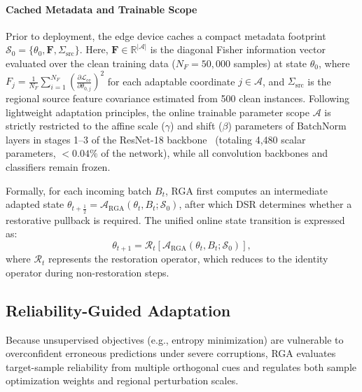 \documentclass[journal]{IEEEtran}
\begin{document}
\paragraph*{Cached Metadata and Trainable Scope}
Prior to deployment, the edge device caches a compact metadata footprint $\mathcal{S}_0 = \{\theta_0, \mathbf{F}, \Sigma_{\mathrm{src}}\}$. Here, $\mathbf{F} \in \mathbb{R}^{|\mathcal{A}|}$ is the diagonal Fisher information vector evaluated over the clean training data ($N_F = 50,000$ samples) at state $\theta_0$, where $F_j = \frac{1}{N_F} \sum_{i=1}^{N_F} (\frac{\partial \mathcal{L}_{\mathrm{ce}}}{\partial \theta_{0,j}})^2$ for each adaptable coordinate $j \in \mathcal{A}$, and $\Sigma_{\mathrm{src}}$ is the regional source feature covariance estimated from 500 clean instances. Following lightweight adaptation principles, the online trainable parameter scope $\mathcal{A}$ is strictly restricted to the affine scale ($\gamma$) and shift ($\beta$) parameters of BatchNorm layers in stages 1--3 of the ResNet-18 backbone~\cite{3} (totaling 4,480 scalar parameters, $<0.04\%$ of the network), while all convolution backbones and classifiers remain frozen.

Formally, for each incoming batch $B_t$, RGA first computes an intermediate adapted state $\theta_{t+\frac{1}{2}} = \mathcal{A}_{\mathrm{RGA}}(\theta_t, B_t; \mathcal{S}_0)$, after which DSR determines whether a restorative pullback is required. The unified online state transition is expressed as:
\begin{equation}
\label{eq:overall_transition}
\theta_{t+1} = \mathcal{R}_t \left[ \mathcal{A}_{\mathrm{RGA}}\left(\theta_t, B_t; \mathcal{S}_0\right) \right],
\end{equation}
where $\mathcal{R}_t$ represents the restoration operator, which reduces to the identity operator during non-restoration steps.

\subsection{Reliability-Guided Adaptation}
Because unsupervised objectives (e.g., entropy minimization) are vulnerable to overconfident erroneous predictions under severe corruptions, RGA evaluates target-sample reliability from multiple orthogonal cues and regulates both sample optimization weights and regional perturbation scales.
\end{document}
